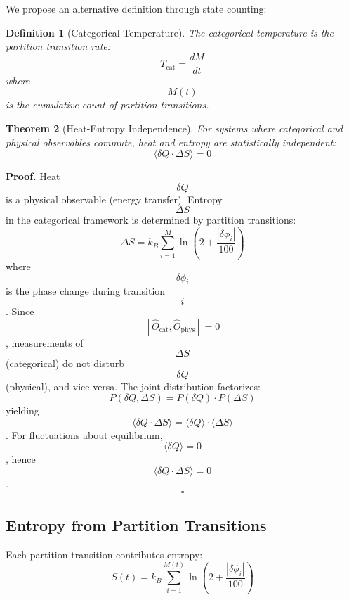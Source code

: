 \documentclass[twocolumn,10pt]{article}
\newtheorem{theorem}{Theorem}[section]
\newtheorem{definition}[theorem]{Definition}
\begin{document}
We propose an alternative definition through state counting:

\begin{definition}[Categorical Temperature]
The categorical temperature is the partition transition rate:
\begin{equation}
T_{\text{cat}} = \frac{dM}{dt}
\end{equation}
where $$M(t)$$ is the cumulative count of partition transitions.
\end{definition}

\begin{theorem}[Heat-Entropy Independence]
For systems where categorical and physical observables commute, heat and entropy are statistically independent:
\begin{equation}
\langle \delta Q \cdot \Delta S \rangle = 0
\end{equation}
\end{theorem}

\textbf{Proof.} Heat $$\delta Q$$ is a physical observable (energy transfer). Entropy $$\Delta S$$ in the categorical framework is determined by partition transitions:
\begin{equation}
\Delta S = k_B \sum_{i=1}^{M} \ln\left(2 + \frac{|\delta\phi_i|}{100}\right)
\end{equation}
where $$\delta\phi_i$$ is the phase change during transition $$i$$. Since $$[\hat{O}_{\text{cat}}, \hat{O}_{\text{phys}}] = 0$$, measurements of $$\Delta S$$ (categorical) do not disturb $$\delta Q$$ (physical), and vice versa. The joint distribution factorizes:
\begin{equation}
P(\delta Q, \Delta S) = P(\delta Q) \cdot P(\Delta S)
\end{equation}
yielding $$\langle \delta Q \cdot \Delta S \rangle = \langle \delta Q \rangle \cdot \langle \Delta S \rangle$$. For fluctuations about equilibrium, $$\langle \delta Q \rangle = 0$$, hence $$\langle \delta Q \cdot \Delta S \rangle = 0$$. \hfill $$\square$$

\subsection{Entropy from Partition Transitions}

Each partition transition contributes entropy:
\begin{equation}
S(t) = k_B \sum_{i=1}^{M(t)} \ln\left(2 + \frac{|\delta\phi_i|}{100}\right)
\end{equation}
\end{document}
